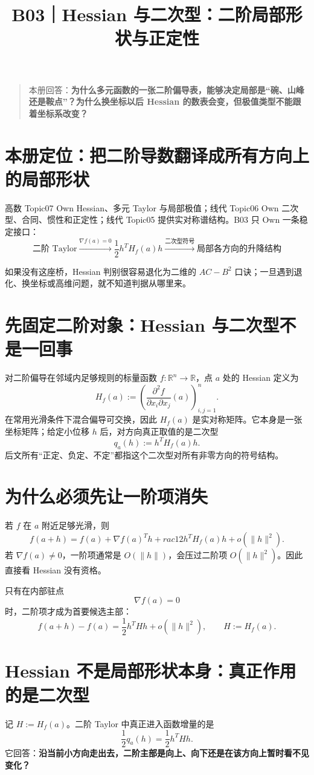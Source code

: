\documentclass[profile=standard]{ipara-handbook}
\title{B03｜Hessian 与二次型：二阶局部形状与正定性}
\author{}
\date{}
\begin{document}
\maketitle

\begin{quote}
本册回答：\textbf{为什么多元函数的一张二阶偏导表，能够决定局部是“碗、山峰还是鞍点”？为什么换坐标以后 Hessian 的数表会变，但极值类型不能跟着坐标系改变？}
\end{quote}

\section{本册定位：把二阶导数翻译成所有方向上的局部形状}
高数 Topic07 Own Hessian、多元 Taylor 与局部极值；线代 Topic06 Own 二次型、合同、惯性和正定性；线代 Topic05 提供实对称谱结构。B03 只 Own 一条稳定接口：
\[
\boxed{
\text{二阶 Taylor}
\xrightarrow{\nabla f(a)=0}
\frac12 h^T H_f(a) h
\xrightarrow{\text{二次型符号}}
\text{局部各方向的升降结构}
}
\]

如果没有这座桥，Hessian 判别很容易退化为二维的 $AC-B^2$ 口诀；一旦遇到退化、换坐标或高维问题，就不知道判据从哪里来。

\section{先固定二阶对象：Hessian 与二次型不是一回事}
对二阶偏导在邻域内足够规则的标量函数 $f:\mathbb R^n\to\mathbb R$，点 $a$ 处的 Hessian 定义为
\[
H_f(a):=\left(\frac{\partial^2 f}{\partial x_i\partial x_j}(a)\right)_{i,j=1}^n.
\]
在常用光滑条件下混合偏导可交换，因此 $H_f(a)$ 是实对称矩阵。它本身是一张坐标矩阵；给定小位移 $h$ 后，对方向真正取值的是二次型
\[
q_a(h):=h^T H_f(a)h.
\]
后文所有“正定、负定、不定”都指这个二次型对所有非零方向的符号结构。

\section{为什么必须先让一阶项消失}
若 $f$ 在 $a$ 附近足够光滑，则
\[
f(a+h)=f(a)+\nabla f(a)^T h+rac12 h^T H_f(a)h+o(\lVert h\rVert^2).
\]
若 $\nabla f(a)\neq0$，一阶项通常是 $O(\lVert h\rVert)$，会压过二阶项 $O(\lVert h\rVert^2)$。因此直接看 Hessian 没有资格。

只有在内部驻点
\[
\nabla f(a)=0
\]
时，二阶项才成为首要候选主部：
\[
f(a+h)-f(a)=\frac12 h^THh+o(\lVert h\rVert^2),\qquad H:=H_f(a).
\]

\section{Hessian 不是局部形状本身：真正作用的是二次型}
记 $H:=H_f(a)$。二阶 Taylor 中真正进入函数增量的是
\[
\frac12 q_a(h)=\frac12 h^THh.
\]
它回答：\textbf{沿当前小方向走出去，二阶主部是向上、向下还是在该方向上暂时看不见变化？}
\end{document}
